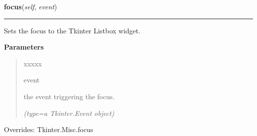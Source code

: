     \vspace{0.5ex}

\hspace{.8\funcindent}\begin{boxedminipage}{\funcwidth}

    \raggedright \textbf{focus}(\textit{self}, \textit{event})

    \vspace{-1.5ex}

    \rule{\textwidth}{0.5\fboxrule}
\setlength{\parskip}{2ex}
    Sets the focus to the Tkinter Listbox widget.

\setlength{\parskip}{1ex}
      \textbf{Parameters}
      \vspace{-1ex}

      \begin{quote}
        \begin{Ventry}{xxxxx}

          \item[event]

          the event triggering the focus.

            {\it (type=a Tkinter.Event object)}

        \end{Ventry}

      \end{quote}

      Overrides: Tkinter.Misc.focus

    \end{boxedminipage}

    \label{nMOLDYN:GUI:Widgets:ComboListbox:insert}

    \vspace{0.5ex}

